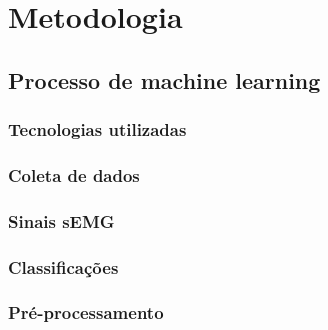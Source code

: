 \chapter{Metodologia}
\section{Processo de machine learning}
\subsection{Tecnologias utilizadas}
\subsection{Coleta de dados}
\subsection{Sinais sEMG}
\subsection{Classificações}
\subsection{Pré-processamento}